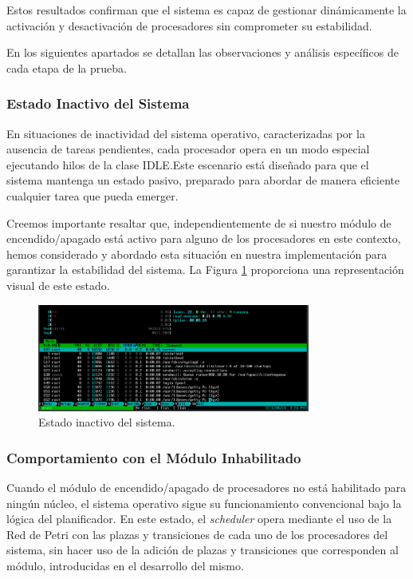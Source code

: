 Estos resultados confirman que el sistema es capaz de gestionar dinámicamente la activación y desactivación de procesadores sin comprometer su estabilidad.

En los siguientes apartados se detallan las observaciones y análisis específicos de cada etapa de la prueba.

\subsubsection{Estado Inactivo del Sistema}
En situaciones de inactividad del sistema operativo, caracterizadas por la ausencia de tareas pendientes, cada procesador opera en un modo especial ejecutando hilos de la clase IDLE.\@ Este escenario está diseñado para que el sistema mantenga un estado pasivo, preparado para abordar de manera eficiente cualquier tarea que pueda emerger.\par

Creemos importante resaltar que, independientemente de si nuestro módulo de encendido/apagado está activo para alguno de los procesadores en este contexto, hemos considerado y abordado esta situación en nuestra implementación para garantizar la estabilidad del sistema. La Figura \ref{fig:cpuOnOff-result-idle} proporciona una representación visual de este estado.\par

\begin{figure}[H]
    \centering
    \includegraphics[width=0.8\textwidth]{images/cpuOnOff-result-idle.png}
    \caption{Estado inactivo del sistema.}
    \label{fig:cpuOnOff-result-idle}
\end{figure}

\subsubsection{Comportamiento con el Módulo Inhabilitado}
Cuando el módulo de encendido/apagado de procesadores no está habilitado para ningún núcleo, el sistema operativo sigue su funcionamiento convencional bajo la lógica del planificador. En este estado, el \textit{scheduler} opera mediante el uso de la Red de Petri  con las plazas y transiciones de cada uno de los procesadores del sistema, sin hacer uso de la adición de plazas y transiciones que corresponden al módulo, introducidas en el desarrollo del mismo.\par

